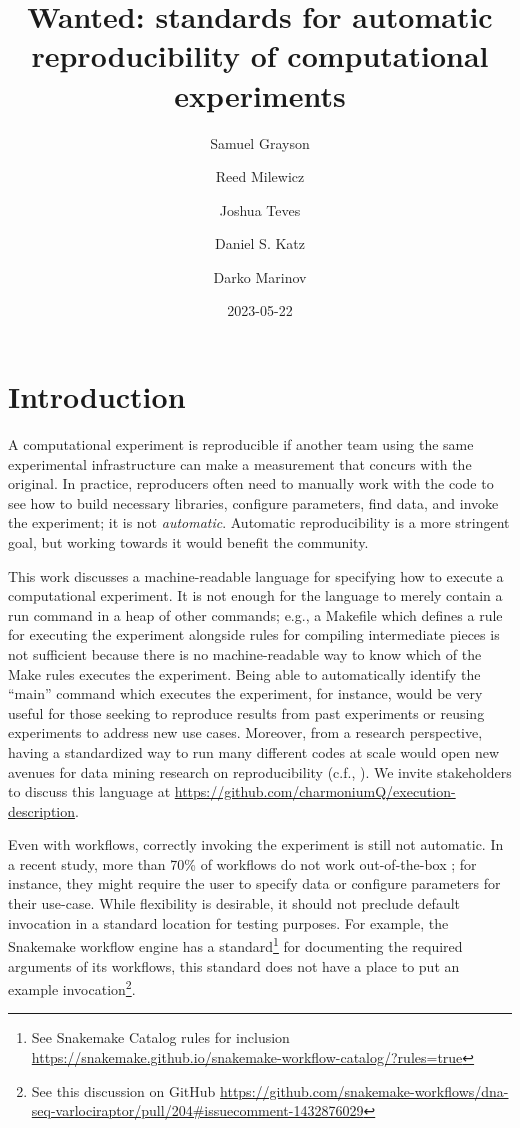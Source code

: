 \documentclass[manuscript,authordraft]{acmart}
\title{Wanted: standards for automatic reproducibility of computational
experiments}
\author{Samuel Grayson}
\affiliation{%
    \institution{University of Illinois Urbana-Champaign}%
    \department{Department of Computer Science}%
    \streetaddress{201 North Goodwin Avenue MC 258}%
    \city{Urbana}%
    \state{IL}%
    \postcode{61801-2302}%
    \country{USA}%
    }
\author{Reed Milewicz}
\affiliation{%
    \institution{Sandia National Laboratories}%
    \department{Software Engineering and Research Department}%
    \streetaddress{1515 Eubank Blvd SE1515 Eubank Blvd SE}%
    \city{Albuquerque}%
    \state{NM}%
    \postcode{87123}%
    \country{USA}%
    }
\author{Joshua Teves}
\affiliation{%
    \institution{Sandia National Laboratories}%
    \department{Software Engineering and Research Department}%
    \streetaddress{1515 Eubank Blvd SE1515 Eubank Blvd SE}%
    \city{Albuquerque}%
    \state{NM}%
    \postcode{87123}%
    \country{USA}%
    }
\author{Daniel S. Katz}
\affiliation{%
    \institution{University of Illinois Urbana-Champaign Department of
Computer Science}%
    \department{Department of Computer Science}%
    \streetaddress{201 North Goodwin Avenue MC 258}%
    \city{Urbana}%
    \state{IL}%
    \postcode{61801-2302}%
    \country{USA}%
    }
\author{Darko Marinov}
\affiliation{%
    \institution{University of Illinois Urbana-Champaign}%
    \department{Department of Computer Science}%
    \streetaddress{201 North Goodwin Avenue MC 258}%
    \city{Urbana}%
    \state{IL}%
    \postcode{61801-2302}%
    \country{USA}%
    }
\date{2023-05-22}
\begin{document}
\maketitle

\renewcommand{\shortauthors}{Grayson et al.}


\hypertarget{introduction}{%
\section{Introduction}\label{introduction}}

A computational experiment is reproducible if another team using the
same experimental infrastructure can make a measurement that concurs
with the original. In practice, reproducers often need to manually work
with the code to see how to build necessary libraries, configure
parameters, find data, and invoke the experiment; it is not
\emph{automatic}. Automatic reproducibility is a more stringent goal,
but working towards it would benefit the community.

This work discusses a machine-readable language for specifying how to
execute a computational experiment. It is not enough for the language to
merely contain a run command in a heap of other commands; e.g., a
Makefile which defines a rule for executing the experiment alongside
rules for compiling intermediate pieces is not sufficient because there
is no machine-readable way to know which of the Make rules executes the
experiment. Being able to automatically identify the ``main'' command
which executes the experiment, for instance, would be very useful for
those seeking to reproduce results from past experiments or reusing
experiments to address new use cases. Moreover, from a research
perspective, having a standardized way to run many different codes at
scale would open new avenues for data mining research on reproducibility
(c.f., \cite{collberg_repeatability_2016}). We invite stakeholders to
discuss this language at
\url{https://github.com/charmoniumQ/execution-description}.

Even with workflows, correctly invoking the experiment is still not
automatic. In a recent study, more than 70\% of workflows do not work
out-of-the-box \cite{grayson_automatic_2023}; for instance, they might
require the user to specify data or configure parameters for their
use-case. While flexibility is desirable, it should not preclude default
invocation in a standard location for testing purposes. For example, the
Snakemake workflow engine has a standard\footnote{See Snakemake Catalog
  rules for inclusion
  \url{https://snakemake.github.io/snakemake-workflow-catalog/?rules=true}}
for documenting the required arguments of its workflows, this standard
does not have a place to put an example invocation\footnote{See this
  discussion on GitHub
  \url{https://github.com/snakemake-workflows/dna-seq-varlociraptor/pull/204\#issuecomment-1432876029}}.
\end{document}
